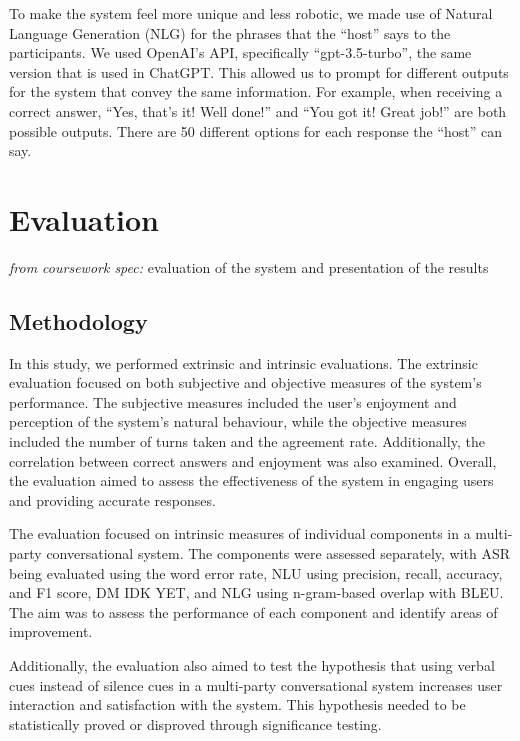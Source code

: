 \documentclass[hidelinks, 11pt]{article}
\begin{document}
To make the system feel more unique and less robotic, we made use of Natural Language Generation (NLG) for the phrases that the “host” says to the participants. We used OpenAI's API, specifically “gpt-3.5-turbo”, the same version that is used in ChatGPT. This allowed us to prompt for different outputs for the system that convey the same information. For example, when receiving a correct answer, “Yes, that's it! Well done!” and “You got it! Great job!” are both possible outputs. There are 50 different options for each response the “host” can say.


\section{Evaluation}
\label{sec:evaluation}

\textit{from coursework spec:} evaluation of the system and presentation of the results

\subsection{Methodology}
\label{subsec:methodology}
In this study, we performed extrinsic and intrinsic evaluations. The extrinsic evaluation focused on both subjective and objective measures of the system's performance. The subjective measures included the user's enjoyment and perception of the system's natural behaviour, while the objective measures included the number of turns taken and the agreement rate. Additionally, the correlation between correct answers and enjoyment was also examined. Overall, the evaluation aimed to assess the effectiveness of the system in engaging users and providing accurate responses.

The evaluation focused on intrinsic measures of individual components in a multi-party conversational system. The components were assessed separately, with ASR being evaluated using the word error rate, NLU using precision, recall, accuracy, and F1 score, DM IDK YET, and NLG using n-gram-based overlap with BLEU. The aim was to assess the performance of each component and identify areas of improvement.

Additionally, the evaluation also aimed to test the hypothesis that using verbal cues instead of silence cues in a multi-party conversational system increases user interaction and satisfaction with the system. This hypothesis needed to be statistically proved or disproved through significance testing.
\end{document}
